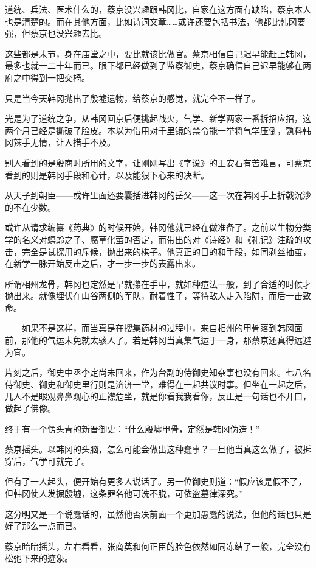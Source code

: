 道统、兵法、医术什么的，蔡京没兴趣跟韩冈比，自家在这方面有缺陷，蔡京本人也是清楚的。而在其他方面，比如诗词文章……或许还要包括书法，他都比韩冈要强，但蔡京也没兴趣去比。

这些都是末节，身在庙堂之中，要比就该比做官。蔡京相信自己迟早能赶上韩冈，最多也就一二十年而已。眼下都已经做到了监察御史，蔡京确信自己迟早能够在两府之中得到一把交椅。

只是当今天韩冈抛出了殷墟遗物，给蔡京的感觉，就完全不一样了。

光是为了道统之争，从韩冈回京后便挑起战火，气学、新学两家一番拆招应招，这两个月已经是撕破了脸皮。本以为借用对千里镜的禁令能一举将气学压倒，孰料韩冈辣手无情，让人措手不及。

别人看到的是殷商时所用的文字，让刚刚写出《字说》的王安石有苦难言，可蔡京看到的则是韩冈手段和心计，以及能狠下心来的决断。

从天子到朝臣——或许里面还要囊括进韩冈的岳父——这一次在韩冈手上折戟沉沙的不在少数。

或许从请求编纂《药典》的时候开始，韩冈他就已经在做准备了。之前以生物分类学的名义对螟蛉之子、腐草化萤的否定，而带出的对《诗经》和《礼记》注疏的攻击，完全是试探用的斥候，抛出来的棋子。他真正的目的和手段，如同剥丝抽茧，在新学一脉开始反击之后，才一步一步的表露出来。

所谓相州龙骨，韩冈也定然是早就攥在手中，就如种痘法一般，到了合适的时候才抛出来。就像埋伏在山谷两侧的军队，耐着性子，等待敌人走入陷阱，而后一击致命。

——如果不是这样，而当真是在搜集药材的过程中，来自相州的甲骨落到韩冈面前，那他的气运未免就太骇人了。若是韩冈当真集气运于一身，那蔡京还真得远避为宜。

片刻之后，御史中丞李定尚未回来，作为台副的侍御史知杂事也没有回来。七八名侍御史、御史和御史里行则是济济一堂，难得在一起共议时事。但坐在一起之后，几人不是眼观鼻鼻观心的正襟危坐，就是你看我我看你，反正是一句话也不开口，做起了佛像。

终于有一个愣头青的新晋御史：“什么殷墟甲骨，定然是韩冈伪造！”

蔡京摇头。以韩冈的头脑，怎么可能会做出这种蠢事？一旦他当真这么做了，被拆穿后，气学可就完了。

但有了一人起头，便开始有更多人说话了。另一位御史则道：“假应该是假不了，但韩冈使人发掘殷墟，这条罪名他可洗不脱，可依盗墓律深究。”

这分明又是一个说蠢话的，虽然他否决前面一个更加愚蠢的说法，但他的话也只是好了那么一点而已。

蔡京暗暗摇头，左右看看，张商英和何正臣的脸色依然如同冻结了一般，完全没有松弛下来的迹象。

